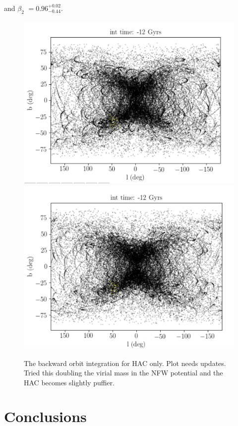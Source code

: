 \documentclass[fleqn,usenatbib]{mnras}
\begin{document}
 and  $\beta_{2}$ $=$$ 0.96^{+0.02}_{-0.44}$.
\begin{figure}
	       \includegraphics[scale=0.3]{HAC12Gyrs.png}
	       	       \includegraphics[scale=0.3]{HAC12Gyrs_doublemass.png}
   \caption{The backward orbit integration for HAC only. Plot needs updates. Tried this doubling the virial mass in the NFW potential and the HAC becomes slightly puffier.}
    \label{fig:rewind}
\end{figure}

\section{Conclusions}
\end{document}
